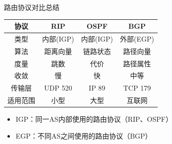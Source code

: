 \documentclass[10pt, aspectratio=169]{beamer}
\begin{document}
\begin{frame}{路由协议对比总结}
    \begin{table}
        \centering
        \begin{tabular}{|c|c|c|c|}
            \hline
            \textbf{协议} & \textbf{RIP} & \textbf{OSPF} & \textbf{BGP} \\
            \hline
            类型 & 内部(IGP) & 内部(IGP) & 外部(EGP) \\
            算法 & 距离向量 & 链路状态 & 路径向量 \\
            度量 & 跳数 & 代价 & 路径属性 \\
            收敛 & 慢 & 快 & 中等 \\
            传输层 & UDP 520 & IP 89 & TCP 179 \\
            适用范围 & 小型 & 大型 & 互联网 \\
            \hline
        \end{tabular}
    \end{table}
    \vspace{0.5em}
    \begin{itemize}
        \item IGP：同一AS内部使用的路由协议（RIP、OSPF）
        \item EGP：不同AS之间使用的路由协议（BGP）
    \end{itemize}
\end{frame}
\end{document}
